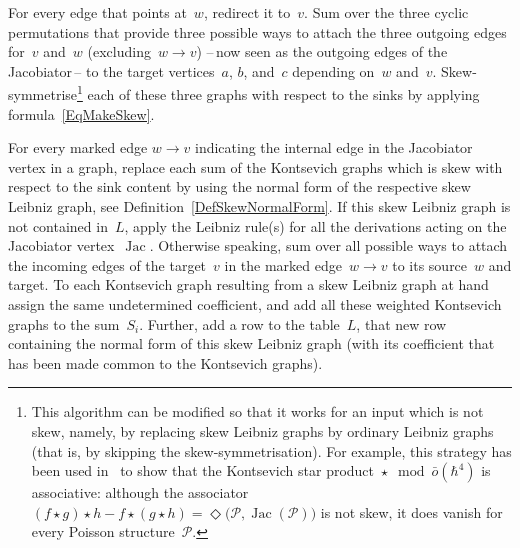 \documentclass[a4paper]{jpconf}%
\theoremstyle{definition}
\theoremstyle{remark}
\newtheorem{rem}{Remark}%
\newcommand{\cP}{\mathcal{P}}\newcommand{\cR}{\mathcal{R}}
\DeclareMathOperator{\Jac}{Jac}
\begin{document}
For every edge that points at~$w$, redirect it to~$v$.
Sum over the three cyclic permutations that provide %
three possible ways to attach the three outgoing edges for~$v$ and~$w$ (excluding~$w\to v$) 
--\,now %
seen as the outgoing edges of the Jacobiator\,-- to the target vertices~$a$, $b$, and~$c$
depending on~$w$ and~$v$.
Skew\/-\/symmetrise\footnote{%
This algorithm can be modified so that it works for an input which is not skew, namely,
by replacing skew Leibniz graphs by ordinary Leibniz graphs (that is, by skipping the skew\/-\/symmetrisation).
For example, this strategy has been used in~\cite{sqs15,cpp} to show that the Kontsevich star 
product~$\star\mod\bar{o}(\hbar^4)$ is associative: although
the associator $(f\star g)\star h - f\star(g\star h) = \Diamond\bigl(\cP,\Jac(\cP)\bigr)$ 
is not skew, it does vanish for every Poisson structure~$\cP$.%
}
each of these three graphs with respect to the sinks
by applying for\-mu\-la~\eqref{EqMakeSkew}.%


For every marked edge $w\to v$ %
indicating the internal %
edge in the Jacobiator vertex in a graph, replace each %
sum of the Kontsevich graphs which is skew with respect to the sink content by using the normal form of the respective skew Leibniz graph, see Definition~\ref{DefSkewNormalForm}.
%
%
If this skew Leibniz graph is not contained in~$L$, %
apply the Leibniz rule(s) for all the derivations acting on the Jacobiator vertex~$\Jac$. %
Otherwise speaking, %
sum over all possible ways to attach the incoming edges of the target~$v$ 
in the marked edge~$w\to v$ to its source~$w$ and target.
To each Kontsevich graph resulting from a skew Leibniz graph at hand assign 
the same undetermined coefficient, and add all these weighted Kontsevich graphs to the sum~$S_{i}$. 
Further, add a row to the table~$L$, that new row containing the normal form of
this skew Leibniz graph (with its coefficient
that has been made common to the Kontsevich graphs). %
\end{document}
